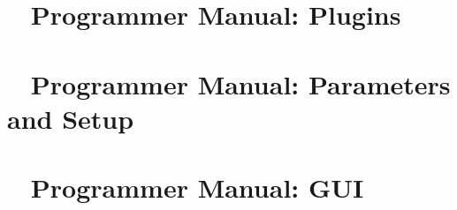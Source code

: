 
 \cleardoublepage
\chapter{\dabc~ Programmer Manual: Plugins}
 \cleardoublepage
\chapter{\dabc~ Programmer Manual: Parameters and Setup}
 \cleardoublepage
\chapter{\dabc~ Programmer Manual: GUI}
 \cleardoublepage
